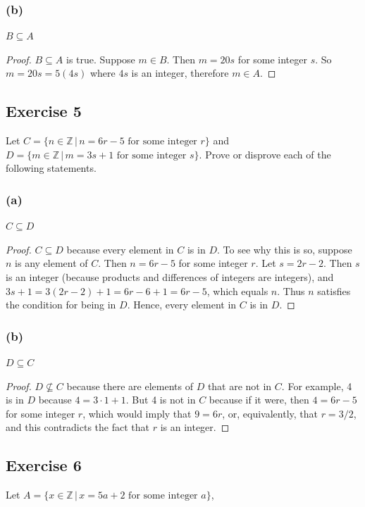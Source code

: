 \documentclass[14pt]{extarticle}
\newcommand{\Z}{\mathbb{Z}}
\begin{document}
\subsubsection{(b)}
\(B \subseteq A\)

\begin{proof}
\(B \subseteq A\) is true. Suppose $m \in B$. Then $m = 20s$ for some integer $s$. So $m = 20s = 5(4s)$ where $4s$ 
is an integer, therefore $m \in A$.
\end{proof}

\subsection{Exercise 5}
Let \(C = \{n \in \Z \, | \, n = 6r-5 \text{ for some integer } r\}\) and \(D = \{m \in \Z \, | \, m = 3s+1 
\text{ for some integer } s\}\). Prove or disprove each of the following statements.

\subsubsection{(a)}
\(C \subseteq D\)

\begin{proof}
\(C \subseteq D\) because every element in $C$ is in $D$. To see why this is so, suppose $n$ is any element of $C$. 
Then \(n = 6r - 5\) for some integer $r$. Let \(s = 2r - 2\). Then $s$ is an integer (because products and 
differences of integers are integers), and \(3s + 1 = 3(2r - 2) + 1 = 6r - 6 + 1 = 6r - 5\), which equals $n$. Thus 
$n$ satisfies the condition for being in $D$. Hence, every element in $C$ is in $D$.
\end{proof}

\subsubsection{(b)}
\(D \subseteq C\)

\begin{proof}
\(D \nsubseteq C\) because there are elements of $D$ that are not in $C$. For example, 4 is in $D$ because 
\(4 = 3 \cdot 1 + 1\). But 4 is not in $C$ because if it were, then \(4 = 6r - 5\) for some integer $r$, which would 
imply that \(9 = 6r\), or, equivalently, that \(r = 3/2\), and this contradicts the fact that $r$ is an integer.
\end{proof}


\subsection{Exercise 6}
Let \(A = \{x \in \Z \, | \, x = 5a+2 \text{ for some integer } a\}\), 
\end{document}
